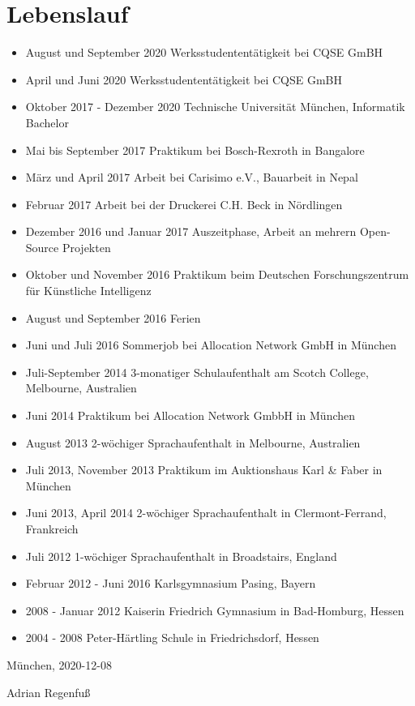 \documentclass[11pt,a4paper]{article}
\begin{document}
\section*{Lebenslauf}
\begin{itemize}
\item[] August und September 2020 \hfill Werksstudententätigkeit bei CQSE GmBH
\item[] April und Juni 2020 \hfill Werksstudententätigkeit bei CQSE GmBH
\item[] Oktober 2017 - Dezember 2020 \hfill Technische Universität München, Informatik Bachelor
\item[] Mai bis September 2017 \hfill Praktikum bei Bosch-Rexroth in Bangalore
\item[] März und April 2017 \hfill Arbeit bei Carisimo e.V., Bauarbeit in Nepal
\item[] Februar 2017 \hfill Arbeit bei der Druckerei C.H. Beck in Nördlingen
\item[] Dezember 2016 und Januar 2017 \hfill Auszeitphase, Arbeit an mehrern Open-Source Projekten
\item[] Oktober und November 2016 \hfill Praktikum beim Deutschen Forschungszentrum für Künstliche Intelligenz
\item[] August und September 2016 \hfill Ferien
\item[] Juni und Juli 2016 \hfill Sommerjob bei Allocation Network GmbH in München
\item[] Juli-September 2014 \hfill 3-monatiger Schulaufenthalt am Scotch College, Melbourne, Australien
\item[] Juni 2014 \hfill Praktikum bei Allocation Network GmbbH in München
\item[] August 2013 \hfill 2-wöchiger Sprachaufenthalt in Melbourne, Australien
\item[] Juli 2013, November 2013 \hfill Praktikum im Auktionshaus Karl \& Faber in München
\item[] Juni 2013, April 2014 \hfill 2-wöchiger Sprachaufenthalt in Clermont-Ferrand, Frankreich
\item[] Juli 2012 \hfill 1-wöchiger Sprachaufenthalt in Broadstairs, England
\item[] Februar 2012 - Juni 2016 \hfill Karlsgymnasium Pasing, Bayern
\item[] 2008 - Januar 2012 \hfill Kaiserin Friedrich Gymnasium in Bad-Homburg, Hessen
\item[] 2004 - 2008 \hfill Peter-Härtling Schule in Friedrichsdorf, Hessen
\end{itemize}

München, 2020-12-08

Adrian Regenfuß
\end{document}
